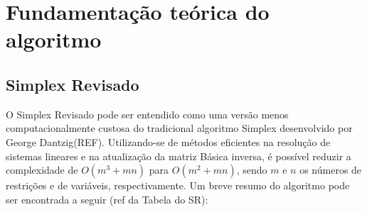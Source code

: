 \section{Fundamentação teórica do algoritmo} \label{sec:algoritmo}
    \subsection{Simplex Revisado}
        O Simplex Revisado pode ser entendido como uma versão menos computacionalmente custosa do tradicional algoritmo Simplex desenvolvido por George Dantzig(REF). Utilizando-se de métodos eficientes na resolução de sistemas lineares e na atualização da matriz Básica inversa, é possível reduzir a complexidade de $O(m^{3} + mn)$ para $O(m^{2} + mn)$, sendo $m$ e $n$ os números de restrições e de variáveis, respectivamente. Um breve resumo do algoritmo pode ser encontrada a seguir (ref da Tabela do SR):
        
        
        
        
